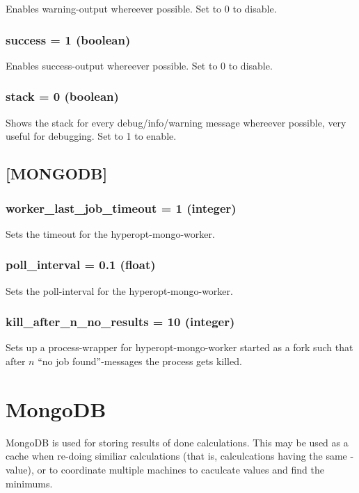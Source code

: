 \documentclass[]{scrartcl}
\begin{document}
Enables warning-output whereever possible. Set to 0 to disable.

\subsubsection{success = 1 (boolean)}

Enables success-output whereever possible. Set to 0 to disable.

\subsubsection{stack = 0 (boolean)}

Shows the stack for every debug/info/warning message whereever possible,
very useful for debugging. Set to 1 to enable.

\subsection{[MONGODB]}
\label{mongodbconfig}

\subsubsection{worker\_last\_job\_timeout = 1 (integer)}

Sets the timeout for the hyperopt-mongo-worker.

\subsubsection{poll\_interval = 0.1 (float)}

Sets the poll-interval for the hyperopt-mongo-worker.

\subsubsection{kill\_after\_n\_no\_results = 10 (integer)}

Sets up a process-wrapper for hyperopt-mongo-worker started as a fork such that after $n$ ``no job found''-messages
the process gets killed.

\section{MongoDB}

MongoDB is used for storing
results of done calculations. This may be used as a cache when re-doing similiar calculations (that
is, calculcations having the same -value), or to coordinate multiple machines
to caculcate values and find the minimums.
\end{document}
